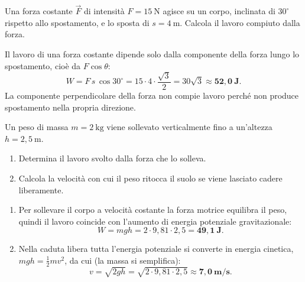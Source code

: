 \begin{question}[ID=1.1, subtitle={Lavoro di una forza costante inclinata di 30°}, tags={lavoro, energia}, difficulty=facile]
Una forza costante $\vec{F}$ di intensità $F = 15\ \text{N}$ agisce su un corpo, inclinata di $30^\circ$ rispetto allo spostamento, e lo sposta di $s = 4\ \text{m}$. Calcola il lavoro compiuto dalla forza.
\begin{solution}
Il lavoro di una forza costante dipende solo dalla componente della forza lungo lo spostamento, cioè da $F\cos\theta$:
\[
W = F\,s\,\cos 30^\circ = 15\cdot 4\cdot \frac{\sqrt{3}}{2} = 30\sqrt{3} \approx \mathbf{52{,}0\ \text{J}}.
\]
La componente perpendicolare della forza non compie lavoro perché non produce spostamento nella propria direzione.
\end{solution}
\end{question}


\begin{question}[ID=1.2, subtitle={Sollevamento di un peso e velocità di caduta libera}, tags={lavoro, energia, caduta libera}, difficulty=facile]
Un peso di massa $m = 2\ \text{kg}$ viene sollevato verticalmente fino a un'altezza $h = 2{,}5\ \text{m}$.
\begin{enumerate}
    \item Determina il lavoro svolto dalla forza che lo solleva.
    \item Calcola la velocità con cui il peso ritocca il suolo se viene lasciato cadere liberamente.
\end{enumerate}
\begin{solution}
\begin{enumerate}
    \item Per sollevare il corpo a velocità costante la forza motrice equilibra il peso, quindi il lavoro coincide con l'aumento di energia potenziale gravitazionale:
    \[
    W = mgh = 2\cdot 9{,}81\cdot 2{,}5 = \mathbf{49{,}1\ \text{J}}.
    \]
    \item Nella caduta libera tutta l'energia potenziale si converte in energia cinetica, $mgh = \tfrac{1}{2}mv^2$, da cui (la massa si semplifica):
    \[
    v = \sqrt{2gh} = \sqrt{2\cdot 9{,}81\cdot 2{,}5} \approx \mathbf{7{,}0\ \text{m/s}}.
    \]
\end{enumerate}
\end{solution}
\end{question}

